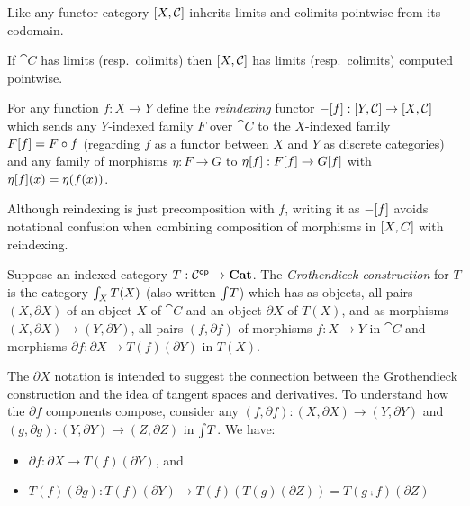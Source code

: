 Like any functor category $[X,\mathcal{C}]$ inherits limits and colimits pointwise from its codomain.

\begin{proposition}
If $\cat{C}$ has limits (resp.~colimits) then $[X,\mathcal{C}]$ has limits (resp.~colimits) computed
pointwise.
\end{proposition}

\begin{definition}[Reindexing]
For any function $f: X \to Y$ define the \emph{reindexing} functor $-[f]: [Y,\mathcal{C}] \to
[X,\mathcal{C}]$ which sends any $Y$-indexed family $F$ over $\cat{C}$ to the $X$-indexed family
$F[f] = F \circ f$ (regarding $f$ as a functor between $X$ and $Y$ as discrete categories) and any
family of morphisms $\eta: F \to G$ to $\eta[f]: F[f] \to G[f]$ with
$\eta[f](x) = \eta(f(x))$.
\end{definition}

Although reindexing is just precomposition with $f$, writing it as $-[f]$ avoids notational
confusion when combining composition of morphisms in $[X,C]$ with reindexing.

\begin{definition}
\label{def:Grothendieck}
Suppose an indexed category $T: \mathcal{C}^{\mathsf{op}} \to \mathbf{Cat}$. The \emph{Grothendieck construction} for $T$ is the
category $\int_{X}T(X)$ (also written $\int_{}T$) which has as objects, all pairs $(X,
\partial X)$ of an object $X$ of $\cat{C}$ and an object $\partial X$ of $T(X)$, and as morphisms $(X,
\partial X) \to (Y, \partial Y)$, all pairs $(f, \partial f)$ of morphisms $f: X \to Y$ in $\cat{C}$ and
morphisms $\partial f: \partial X \to T(f)(\partial Y)$ in $T(X)$.
\end{definition}

\noindent The $\partial X$ notation is intended to suggest the connection between the Grothendieck
construction and the idea of tangent spaces and derivatives. To understand how the $\partial f$ components
compose, consider any $(f, \partial f): (X, \partial X) \to (Y, \partial Y)$ and $(g, \partial g): (Y,
\partial Y) \to (Z, \partial Z)$ in $\int_{}T$. We have:

\begin{itemize}
\item $\partial f: \partial X \to T(f)(\partial Y)$, and
\item $T(f)(\partial g): T(f)(\partial Y) \to T(f)(T(g)(\partial Z)) = T(g \comp f)(\partial Z)$
\end{itemize}

